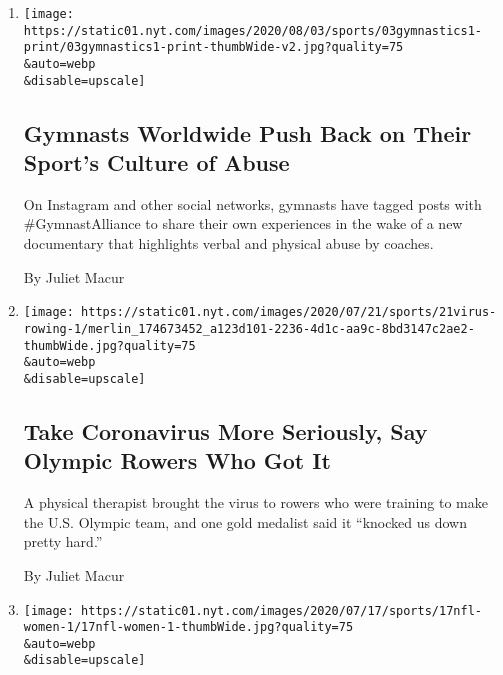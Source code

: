\begin{enumerate}
\def\labelenumi{\arabic{enumi}.}
\item
  \href{/2020/08/03/sports/olympics/gymnastics-abuse-athlete-a.html}{}

  \texttt{[image: https://static01.nyt.com/images/2020/08/03/sports/03gymnastics1-print/03gymnastics1-print-thumbWide-v2.jpg?quality=75\\\&auto=webp\\\&disable=upscale]}

  \hypertarget{gymnasts-worldwide-push-back-on-their-sports-culture-of-abuse}{%
  \subsection{Gymnasts Worldwide Push Back on Their Sport's Culture of
  Abuse}\label{gymnasts-worldwide-push-back-on-their-sports-culture-of-abuse}}

  On Instagram and other social networks, gymnasts have tagged posts
  with \#GymnastAlliance to share their own experiences in the wake of a
  new documentary that highlights verbal and physical abuse by coaches.

  By Juliet Macur
\item
  \href{/2020/07/24/sports/olympics/coronavirus-us-rowing-olympics.html}{}

  \texttt{[image: https://static01.nyt.com/images/2020/07/21/sports/21virus-rowing-1/merlin\_174673452\_a123d101-2236-4d1c-aa9c-8bd3147c2ae2-thumbWide.jpg?quality=75\\\&auto=webp\\\&disable=upscale]}

  \hypertarget{take-coronavirus-more-seriously-say-olympic-rowers-who-got-it}{%
  \subsection{Take Coronavirus More Seriously, Say Olympic Rowers Who
  Got
  It}\label{take-coronavirus-more-seriously-say-olympic-rowers-who-got-it}}

  A physical therapist brought the virus to rowers who were training to
  make the U.S. Olympic team, and one gold medalist said it ``knocked us
  down pretty hard.''

  By Juliet Macur
\item
  \href{/2020/07/17/sports/football/sexual-harassment-washington-dan-snyder.html}{}

  \texttt{[image: https://static01.nyt.com/images/2020/07/17/sports/17nfl-women-1/17nfl-women-1-thumbWide.jpg?quality=75\\\&auto=webp\\\&disable=upscale]}

  \hypertarget{washington-nfl-harassment-report-shocked-many-but-not-women}{%
}
\end{enumerate}

